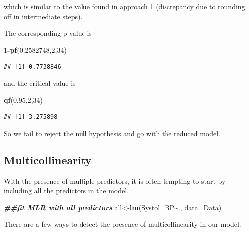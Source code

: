 \documentclass[
]{book}
\newenvironment{Shaded}{\begin{snugshade}}{\end{snugshade}}
\newcommand{\AttributeTok}[1]{\textcolor[rgb]{0.13,0.29,0.53}{#1}}
\newcommand{\DecValTok}[1]{\textcolor[rgb]{0.00,0.00,0.81}{#1}}
\newcommand{\DocumentationTok}[1]{\textcolor[rgb]{0.56,0.35,0.01}{\textbf{\textit{#1}}}}
\newcommand{\FloatTok}[1]{\textcolor[rgb]{0.00,0.00,0.81}{#1}}
\newcommand{\FunctionTok}[1]{\textcolor[rgb]{0.13,0.29,0.53}{\textbf{#1}}}
\newcommand{\NormalTok}[1]{#1}
\newcommand{\OtherTok}[1]{\textcolor[rgb]{0.56,0.35,0.01}{#1}}
\newcommand{\SpecialCharTok}[1]{\textcolor[rgb]{0.81,0.36,0.00}{\textbf{#1}}}
\begin{document}
which is similar to the value found in approach 1 (discrepancy due to rounding off in intermediate steps).

The corresponding p-value is

\begin{Shaded}
\begin{Highlighting}[]
\DecValTok{1}\SpecialCharTok{{-}}\FunctionTok{pf}\NormalTok{(}\FloatTok{0.2582748}\NormalTok{,}\DecValTok{2}\NormalTok{,}\DecValTok{34}\NormalTok{)}
\end{Highlighting}
\end{Shaded}

\begin{verbatim}
## [1] 0.7738846
\end{verbatim}

and the critical value is

\begin{Shaded}
\begin{Highlighting}[]
\FunctionTok{qf}\NormalTok{(}\FloatTok{0.95}\NormalTok{,}\DecValTok{2}\NormalTok{,}\DecValTok{34}\NormalTok{)}
\end{Highlighting}
\end{Shaded}

\begin{verbatim}
## [1] 3.275898
\end{verbatim}

So we fail to reject the null hypothesis and go with the reduced model.

\hypertarget{multicollinearity-1}{%
\subsection*{Multicollinearity}\label{multicollinearity-1}}

With the presence of multiple predictors, it is often tempting to start by including all the predictors in the model.

\begin{Shaded}
\begin{Highlighting}[]
\DocumentationTok{\#\#fit MLR with all predictors}
\NormalTok{all}\OtherTok{\textless{}{-}}\FunctionTok{lm}\NormalTok{(Systol\_BP}\SpecialCharTok{\textasciitilde{}}\NormalTok{., }\AttributeTok{data=}\NormalTok{Data)}
\end{Highlighting}
\end{Shaded}

There are a few ways to detect the presence of multicollinearity in our model.
\end{document}
